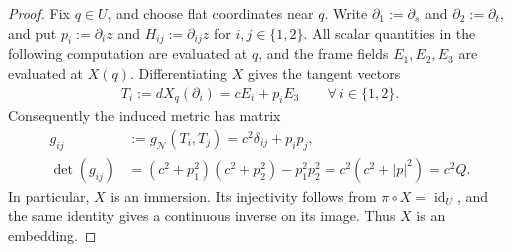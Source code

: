 \documentclass[a4paper,11pt,oneside,reqno]{amsart}
\numberwithin{equation}{section}
\theoremstyle{definition}
\begin{document}
\begin{proof}
    Fix $q\in U$, and choose flat coordinates near $q$.
    Write $\partial_1:=\partial_s$ and
    $\partial_2:=\partial_t$, and put
    $p_i:=\partial_i z$ and $H_{ij}:=\partial_{ij}z$
    for $i,j\in\{1,2\}$. All scalar quantities in the
    following computation are evaluated at $q$, and the
    frame fields $E_1,E_2,E_3$ are evaluated at $X(q)$.
    Differentiating $X$ gives the tangent vectors
    \begin{align*}
        T_i:=dX_q(\partial_i)=cE_i+p_iE_3
        \qquad\forall\,i\in\{1,2\}.
    \end{align*}
    Consequently the induced metric has matrix
    \begin{align*}
        g_{ij}&:=g_{\mathcal N}(T_i,T_j)
        =c^2\delta_{ij}+p_ip_j,\\
        \det(g_{ij})
        &=(c^2+p_1^2)(c^2+p_2^2)-p_1^2p_2^2
        =c^2(c^2+|p|^2)=c^2Q.
    \end{align*}
    In particular, $X$ is an immersion. Its injectivity
    follows from $\pi\circ X=\operatorname{id}_U$, and
    the same identity gives a continuous inverse on its
    image. Thus $X$ is an embedding.


\end{proof}
\end{document}
